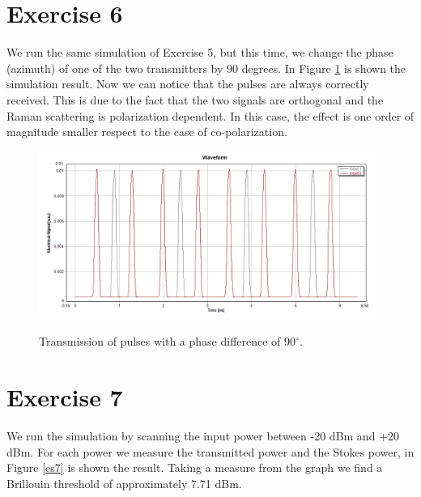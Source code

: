 \documentclass[a4paper,10pt]{report}
\begin{document}
\newpage
\section*{Exercise 6}
We run the same simulation of Exercise 5, but this time, we change the phase (azimuth) of one of the two transmitters by 90 degrees.
In Figure \ref{es6} is shown the simulation result. Now we can notice that the pulses are always correctly received.
This is due to the fact that the two signals are orthogonal and the Raman scattering is polarization dependent.
In this case, the effect is one order of magnitude smaller respect to the case of co-polarization.

\begin{figure}[!ht]
  \centering
  \includegraphics[width=11cm]{es6.png}\\
  \caption{Transmission of pulses with a phase difference of $90^{\circ}$.}
  \label{es6}
\end{figure}


\newpage
\section*{Exercise 7}
We run the simulation by scanning the input power between -20 dBm and +20 dBm. For each power we measure the transmitted power and the Stokes power,
in Figure \ref{es7} is shown the result. Taking a measure from the graph we find a Brillouin threshold of approximately 7.71 dBm. 
\end{document}
